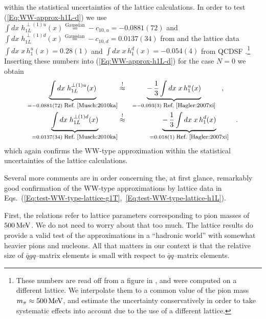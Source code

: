 \documentclass[a4paper,11pt]{article}
\newcommand{\ba}{\begin{eqnarray}}
\newcommand{\ea}{\end{eqnarray}}
\begin{document}
within the statistical uncertainties of the lattice calculations.
%
In order to test (\ref{Eq:WW-approx-h1L-d}) we use
$\int dx\;h_{1L}^{\perp(1)u}(x)\stackrel{\text{Gaussian}}{=}-c_{10,u}=-0.0881(72)$ 
and
$\int dx\;h_{1L}^{\perp(1)d}(x)\stackrel{\text{Gaussian}}{=}-c_{10,d}=0.0137(34)$
from \cite{Musch:2010ka} and the lattice data 
$\int d x \;x\,h_1^u(x)= 0.28(1)$ and
$\int d x \;x\,h_1^d(x)= -0.054(4)$
from QCDSF \cite{Gockeler:2005cj}.\footnote{
  These numbers are read off from a figure in \cite{Gockeler:2005cj},
  and were computed on a different lattice. We interpolate them to a
  common value of the pion mass $m_\pi\approx500\,{\rm MeV}$, and
  estimate the uncertainty conservatively in order to take systematic effects
  into account due to the use of a different lattice.}
Inserting these numbers into  (\ref{Eq:WW-approx-h1L-d}) for the case
$N=0$ we obtain
\ba
        \underbrace{\int d x\;h_{1L}^{\perp(1)u}(x)}
        _{= -0.0881(72)\;\mbox{\footnotesize Ref.~\cite{Musch:2010ka}}}
        &\stackrel{!}{\approx}&
        \underbrace{-\,\frac{1}{3}\int d x\;x\,h_1^u(x)}
        _{= -0.093(3) \;\mbox{\footnotesize Ref.~\cite{Hagler:2007xi}}}
        \hspace{3mm} , \hspace{7mm} \nonumber \\
        \underbrace{\int d x\;h_{1L}^{\perp(1)d}(x)}
        _{= 0.0137(34) \;\mbox{\footnotesize Ref.~\cite{Musch:2010ka}}}
        &\stackrel{!}{\approx}&
        \underbrace{-\,\frac{1}{3}\int d x\;x\,h_1^d(x)}
        _{= 0.018(1) \;\mbox{\footnotesize Ref.~\cite{Hagler:2007xi}}}
        \hspace{3mm}. 
        \label{Eq:test-WW-type-lattice-h1L}
\ea
which again confirms the WW-type approximation within the statistical
uncertainties of the lattice calculations.

Several more comments are in order concerning the, at first glance, remarkably
good confirmation of the  WW-type approximations by lattice data in
Eqs.~(\ref{Eq:test-WW-type-lattice-g1T},~\ref{Eq:test-WW-type-lattice-h1L}).

First, the relations refer to lattice parameters corresponding
to pion masses of $500\,{\rm MeV}$. We do not
need to worry about that too much. The lattice results do provide
a valid test of the approximations in a ``hadronic world'' with
somewhat heavier pions and nucleons. All that matters in our
context is that the relative size of $\bar qgq$--matrix elements
is small with respect to $\bar qq$--matrix elements.
\end{document}
